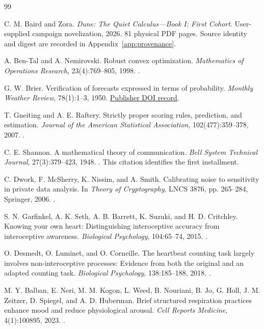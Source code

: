 \small
\begin{thebibliography}{99}
 C. M. Baird and Zora. \emph{Dune: The Quiet Calculus---Book I: First Cohort}. User-supplied campaign novelization, 2026. 81 physical PDF pages. Source identity and digest are recorded in Appendix~\ref{app:provenance}.

 A. Ben-Tal and A. Nemirovski. Robust convex optimization. \emph{Mathematics of Operations Research}, 23(4):769--805, 1998. .

 G. W. Brier. Verification of forecasts expressed in terms of probability. \emph{Monthly Weather Review}, 78(1):1--3, 1950. \href{https://doi.org/fp62r6}{Publisher DOI record}.

 T. Gneiting and A. E. Raftery. Strictly proper scoring rules, prediction, and estimation. \emph{Journal of the American Statistical Association}, 102(477):359--378, 2007. .

 C. E. Shannon. A mathematical theory of communication. \emph{Bell System Technical Journal}, 27(3):379--423, 1948. . This citation identifies the first installment.

 C. Dwork, F. McSherry, K. Nissim, and A. Smith. Calibrating noise to sensitivity in private data analysis. In \emph{Theory of Cryptography}, LNCS 3876, pp. 265--284, Springer, 2006. .

 S. N. Garfinkel, A. K. Seth, A. B. Barrett, K. Suzuki, and H. D. Critchley. Knowing your own heart: Distinguishing interoceptive accuracy from interoceptive awareness. \emph{Biological Psychology}, 104:65--74, 2015. .

 O. Desmedt, O. Luminet, and O. Corneille. The heartbeat counting task largely involves non-interoceptive processes: Evidence from both the original and an adapted counting task. \emph{Biological Psychology}, 138:185--188, 2018. .

 M. Y. Balban, E. Neri, M. M. Kogon, L. Weed, B. Nouriani, B. Jo, G. Holl, J. M. Zeitzer, D. Spiegel, and A. D. Huberman. Brief structured respiration practices enhance mood and reduce physiological arousal. \emph{Cell Reports Medicine}, 4(1):100895, 2023. .


\end{thebibliography}
